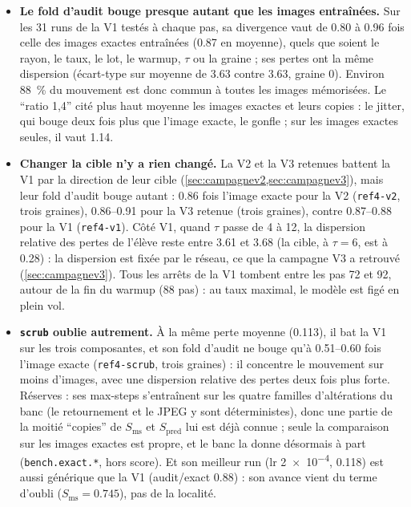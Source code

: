 \documentclass[11pt,a4paper]{article}
\newcommand{\code}[1]{\texttt{#1}}
\begin{document}
\begin{itemize}[leftmargin=1.2em]
  \item \textbf{Le fold d'audit bouge presque autant que les images entraînées.} Sur les 31 runs
    de la V1 testés à chaque pas, sa divergence vaut de \num{0.80} à \num{0.96} fois celle des images
    exactes entraînées (\num{0.87} en moyenne), quels que soient le rayon, le taux, le lot, le
    warmup, $\tau$ ou la graine ; ses pertes ont la même dispersion (écart-type sur moyenne de
    \num{3.63} contre \num{3.63}, graine 0). Environ \SI{88}{\percent} du mouvement est donc commun à
    toutes les images mémorisées. Le \enquote{ratio 1,4} cité plus haut moyenne les images exactes et
    leurs copies : le jitter, qui bouge deux fois plus que l'image exacte, le gonfle ; sur les images
    exactes seules, il vaut \num{1.14}.
  \item \textbf{Changer la cible n'y a rien changé.} La V2 et la V3 retenues battent la V1 par la
    direction de leur cible (\cref{sec:campagnev2,sec:campagnev3}), mais leur fold d'audit bouge
    autant : \num{0.86} fois l'image exacte pour la V2 (\code{ref4-v2}, trois graines),
    \numrange{0.86}{0.91} pour la V3 retenue (trois graines), contre \numrange{0.87}{0.88} pour la V1
    (\code{ref4-v1}). Côté V1, quand $\tau$ passe de 4 à 12, la dispersion relative des pertes de
    l'élève reste entre \num{3.61} et \num{3.68} (la cible, à $\tau=6$, est à \num{0.28}) : la
    dispersion est fixée par le réseau, ce que la campagne V3 a retrouvé (\cref{sec:campagnev3}).
    Tous les arrêts de la V1 tombent entre les pas 72 et 92, autour de la fin du warmup (88 pas) :
    au taux maximal, le modèle est figé en plein vol.
  \item \textbf{\code{scrub} oublie autrement.} À la même perte moyenne (\num{0.113}), il bat la V1 sur
    les trois composantes, et son fold d'audit ne bouge qu'à \numrange{0.51}{0.60} fois l'image exacte
    (\code{ref4-scrub}, trois graines) : il concentre le mouvement sur moins d'images, avec une
    dispersion relative des pertes deux fois plus forte. Réserves : ses max-steps s'entraînent sur
    les quatre familles d'altérations du banc (le retournement et le JPEG y sont déterministes), donc
    une partie de la moitié \enquote{copies} de $S_{\text{ms}}$ et $S_{\text{pred}}$ lui est déjà
    connue ; seule la comparaison sur les images exactes est propre, et le banc la donne désormais
    à part (\code{bench.exact.*}, hors score). Et son meilleur run (lr \num{2e-4}, \num{0.118}) est
    aussi générique que la V1 (audit/exact \num{0.88}) : son avance vient du terme d'oubli
    ($S_{\text{ms}}=\num{0.745}$), pas de la localité.
\end{itemize}
\end{document}
